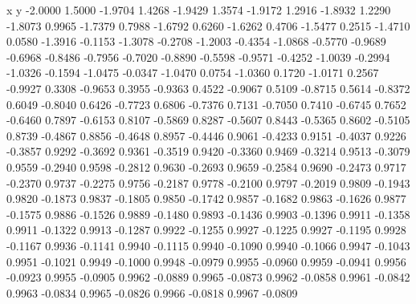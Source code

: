    x y   
   -2.0000    1.5000
   -1.9704    1.4268
   -1.9429    1.3574
   -1.9172    1.2916
   -1.8932    1.2290
   -1.8073    0.9965
   -1.7379    0.7988
   -1.6792    0.6260
   -1.6262    0.4706
   -1.5477    0.2515
   -1.4710    0.0580
   -1.3916   -0.1153
   -1.3078   -0.2708
   -1.2003   -0.4354
   -1.0868   -0.5770
   -0.9689   -0.6968
   -0.8486   -0.7956
   -0.7020   -0.8890
   -0.5598   -0.9571
   -0.4252   -1.0039
   -0.2994   -1.0326
   -0.1594   -1.0475
   -0.0347   -1.0470
    0.0754   -1.0360
    0.1720   -1.0171
    0.2567   -0.9927
    0.3308   -0.9653
    0.3955   -0.9363
    0.4522   -0.9067
    0.5109   -0.8715
    0.5614   -0.8372
    0.6049   -0.8040
    0.6426   -0.7723
    0.6806   -0.7376
    0.7131   -0.7050
    0.7410   -0.6745
    0.7652   -0.6460
    0.7897   -0.6153
    0.8107   -0.5869
    0.8287   -0.5607
    0.8443   -0.5365
    0.8602   -0.5105
    0.8739   -0.4867
    0.8856   -0.4648
    0.8957   -0.4446
    0.9061   -0.4233
    0.9151   -0.4037
    0.9226   -0.3857
    0.9292   -0.3692
    0.9361   -0.3519
    0.9420   -0.3360
    0.9469   -0.3214
    0.9513   -0.3079
    0.9559   -0.2940
    0.9598   -0.2812
    0.9630   -0.2693
    0.9659   -0.2584
    0.9690   -0.2473
    0.9717   -0.2370
    0.9737   -0.2275
    0.9756   -0.2187
    0.9778   -0.2100
    0.9797   -0.2019
    0.9809   -0.1943
    0.9820   -0.1873
    0.9837   -0.1805
    0.9850   -0.1742
    0.9857   -0.1682
    0.9863   -0.1626
    0.9877   -0.1575
    0.9886   -0.1526
    0.9889   -0.1480
    0.9893   -0.1436
    0.9903   -0.1396
    0.9911   -0.1358
    0.9911   -0.1322
    0.9913   -0.1287
    0.9922   -0.1255
    0.9927   -0.1225
    0.9927   -0.1195
    0.9928   -0.1167
    0.9936   -0.1141
    0.9940   -0.1115
    0.9940   -0.1090
    0.9940   -0.1066
    0.9947   -0.1043
    0.9951   -0.1021
    0.9949   -0.1000
    0.9948   -0.0979
    0.9955   -0.0960
    0.9959   -0.0941
    0.9956   -0.0923
    0.9955   -0.0905
    0.9962   -0.0889
    0.9965   -0.0873
    0.9962   -0.0858
    0.9961   -0.0842
    0.9963   -0.0834
    0.9965   -0.0826
    0.9966   -0.0818
    0.9967   -0.0809
